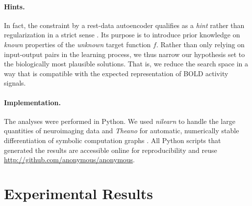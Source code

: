 \documentclass{article} %
\begin{document}
\paragraph{Hints.}
In fact, the constraint by a rest-data autoencoder qualifies as a
\textit{hint}
rather than regularization in a strict sense \cite{abu1994hints}.
Its purpose is to introduce
prior knowledge on
\textit{known} properties of the \textit{unknown} target function $f$.
Rather than only relying on input-output pairs in the learning process,
we thus narrow our hypothesis set to the biologically most plausible solutions.
That is, we reduce the search space in a way that
is compatible with the expected representation of BOLD activity signals.

\paragraph{Implementation.}
The analyses were performed in Python.
We used \textit{nilearn} to handle
the large quantities of neuroimaging data 
\cite{abrah14}
and
\textit{Theano} for automatic, numerically stable
differentiation of symbolic computation graphs
\cite{bastien2012theano, bergstra2010theano}.
All Python scripts that generated the results are
accessible online for reproducibility and reuse
\url{http://github.com/anonymous/anonymous}.

\section{Experimental Results}
\end{document}
